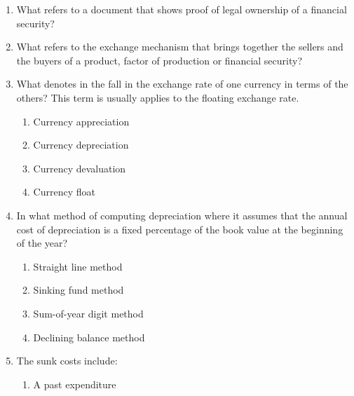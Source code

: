 \documentclass[11pt,a4paper]{article}
\begin{document}
\begin{enumerate}
\begin{enumerate}[label=\Alph*.]
\end{enumerate}
\item{What refers to a document that shows proof of legal ownership of a financial security?}
\\
\item{What refers to the exchange mechanism that brings together the sellers and the buyers of a product, factor of production or financial security?}
\\
\item{What denotes in the fall in the exchange rate of one currency in terms of the others? This term is usually applies to the floating exchange rate.}
\begin{enumerate}[label=\Alph*.]
\item{Currency appreciation}
\item{Currency depreciation}
\item{Currency devaluation}
\item{Currency float}
\end{enumerate}
\item{In what method of computing depreciation where it assumes that the annual cost of depreciation is a fixed percentage of the book value at the beginning of the year?}
\begin{enumerate}[label=\Alph*.]
\item{Straight line method}
\item{Sinking fund method}
\item{Sum-of-year digit method}
\item{Declining balance method}
\end{enumerate}
\item{The sunk costs include:}
\begin{enumerate}[label=\Alph*.]
\item{A past expenditure}

\end{enumerate}
\end{enumerate}
\end{document}
